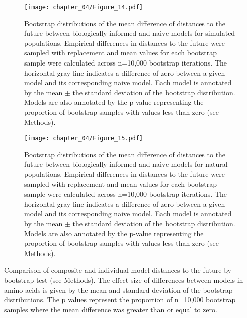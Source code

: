 \begin{figure}
  \begin{center}
  \texttt{[image: chapter\_04/Figure\_14.pdf]}
  \caption{
  Bootstrap distributions of the mean difference of distances to the future between biologically-informed and naive models for simulated populations.
  Empirical differences in distances to the future were sampled with replacement and mean values for each bootstrap sample were calculated across n=10,000 bootstrap iterations.
  The horizontal gray line indicates a difference of zero between a given model and its corresponding naive model.
  Each model is annotated by the mean $\pm$ the standard deviation of the bootstrap distribution.
  Models are also annotated by the p-value representing the proportion of bootstrap samples with values less than zero (see Methods).
  }
  \label{fig:bootstrap_distributions_for_simulated_sample_3}
  \end{center}
\end{figure}

\begin{figure}
  \begin{center}
  \texttt{[image: chapter\_04/Figure\_15.pdf]}
  \caption{
  Bootstrap distributions of the mean difference of distances to the future between biologically-informed and naive models for natural populations.
  Empirical differences in distances to the future were sampled with replacement and mean values for each bootstrap sample were calculated across n=10,000 bootstrap iterations.
  The horizontal gray line indicates a difference of zero between a given model and its corresponding naive model.
  Each model is annotated by the mean $\pm$ the standard deviation of the bootstrap distribution.
  Models are also annotated by the p-value representing the proportion of bootstrap samples with values less than zero (see Methods).
  }
  \label{fig:bootstrap_distributions_for_natural_sample_1_with_90_vpm_sliding}
  \end{center}
\end{figure}

\begin{table}
  \begin{center}
    \scalebox{0.7}{
        
    }
    \caption{
      Comparison of composite and individual model distances to the future by bootstrap test (see Methods).
      The effect size of differences between models in amino acids is given by the mean and standard deviation of the bootstrap distributions.
      The p values represent the proportion of n=10,000 bootstrap samples where the mean difference was greater than or equal to zero.
    }
    \label{table:composite_vs_individual_model_comparison}
  \end{center}
\end{table}

